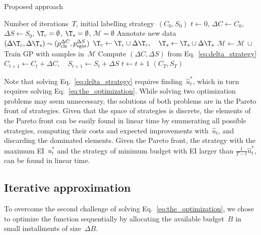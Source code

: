 \begin{algorithm}[t]
\caption{Proposed approach}
\label{alg:the_algorithm}
\begin{algorithmic}[1]
\Require Number of iterations~$T$, initial labelling strategy~$(C_0, S_0)$
\State $t\leftarrow 0$, $\Delta{}C\leftarrow C_0$, $\Delta{}S\leftarrow S_0$, $\T_c=\emptyset$, $\T_s=\emptyset$, $\mathcal{M}=\emptyset$
\State Annotate new data $(\Delta{}\T_c,\Delta{}\T_s)\sim{}(p_\textrm{cls}^{\Delta{}C}, p_\textrm{sgm}^{\Delta{}S})$
\State $\T_c \leftarrow \T_c \cup \Delta{}\T_c, \quad \T_s \leftarrow \T_s \cup \Delta{}\T_s$ 
\State $\mathcal{M} \leftarrow \mathcal{M} \,\cup\,$ %
\State Train GP with samples in~$\mathcal{M}$
\State Compute $(\Delta{}C, \Delta{}S)$ from Eq.~\eqref{eq:delta_strategy}
\State $C_{t+1} \leftarrow C_t + \Delta{}C, \quad S_{t+1} \leftarrow S_t + \Delta{}S$
\State $t\leftarrow t+1$
\EndWhile
\Ensure $(C_T, S_T)$
\end{algorithmic}
\end{algorithm}

Note that solving Eq.~\eqref{eq:delta_strategy} requires finding~$\hat{u}_t^*$, which in turn requires solving Eq.~\eqref{eq:the_optimization}. While solving two optimization problems may seem unnecessary, the solutions of both problems are in the Pareto front of strategies. Given that the space of strategies is discrete, the elements of the Pareto front can be easily found in linear time by enumerating all possible strategies, computing their costs and expected improvements with~$\hat{u}_t$, and discarding the dominated elements. Given the Pareto front, the strategy with the maximum EI~$u^*_t$ and the strategy of minimum budget with EI larger than $\frac{1}{T - t}\hat{u}^*_t$, can be found in linear time.

\iffalse
\subsection{Iterative approximation}
To overcome the second challenge of solving Eq.~\eqref{eq:the_optimization}, we chose to optimize the function sequentially by allocating the available budget~$B$ in small installments of size~$\Delta{}B$. 

